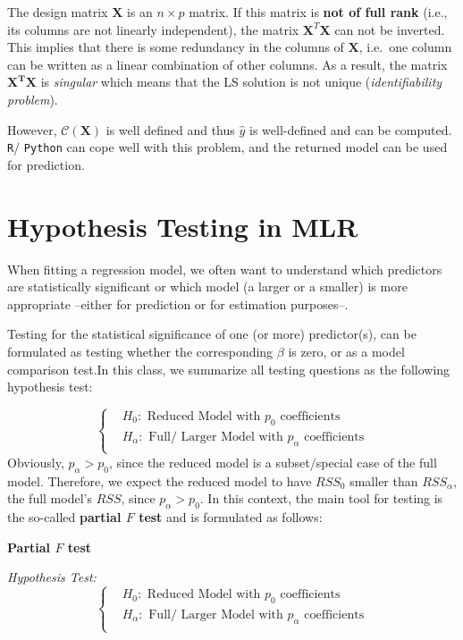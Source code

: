\documentclass[
]{book}
\begin{document}
The design matrix \(\mathbf{X}\) is an \(n\times p\) matrix. If this matrix is \textbf{not of full rank} (i.e., its columns are not linearly independent), the matrix \(\mathbf{X}^T \mathbf{X}\) can not be inverted. This implies that there is some redundancy in the columns of \(\mathbf{X}\), i.e.~one column can be written as a linear combination of other columns. As a result, the matrix \(\mathbf{X^T X}\) is \emph{singular} which means that the LS solution is not unique (\emph{identifiability problem}).

However, \(\mathcal{C}(\mathbf{X})\) is well defined and thus \(\hat{y}\) is well-defined and can be computed. \texttt{R}/ \texttt{Python} can cope well with this problem, and the returned model can be used for prediction.

\section{Hypothesis Testing in MLR}\label{hypothesis-testing-in-mlr}

When fitting a regression model, we often want to understand which predictors are statistically significant or which model (a larger or a smaller) is more appropriate --either for prediction or for estimation purposes--.

Testing for the statistical significance of one (or more) predictor(s), can be formulated as testing whether the corresponding \(\beta\) is zero, or as a model comparison test.In this class, we summarize all testing questions as the following hypothesis test:

\[
\begin{cases}
& H_0: \text{ Reduced Model with } p_0 \text{ coefficients}\\
& H_{\alpha}: \text{ Full/ Larger Model with } p_{\alpha} \text{ coefficients}\\
\end{cases}
\]
Obviously, \(p_{\alpha} > p_0\), since the reduced model is a subset/special case of the full model. Therefore, we expect the reduced model to have \(RSS_0\) smaller than \(RSS_{\alpha}\), the full model's \(RSS\), since \(p_{\alpha} > p_0\). In this context, the main tool for testing is the so-called \textbf{partial \(F\) test} and is formulated as follows:

\textbf{Partial \(F\) test}

\emph{Hypothesis Test:}
\[
\begin{cases}
& H_0: \text{ Reduced Model with } p_0 \text{ coefficients}\\
& H_{\alpha}: \text{ Full/ Larger Model with } p_{\alpha} \text{ coefficients}\\
\end{cases}
\]
\end{document}
